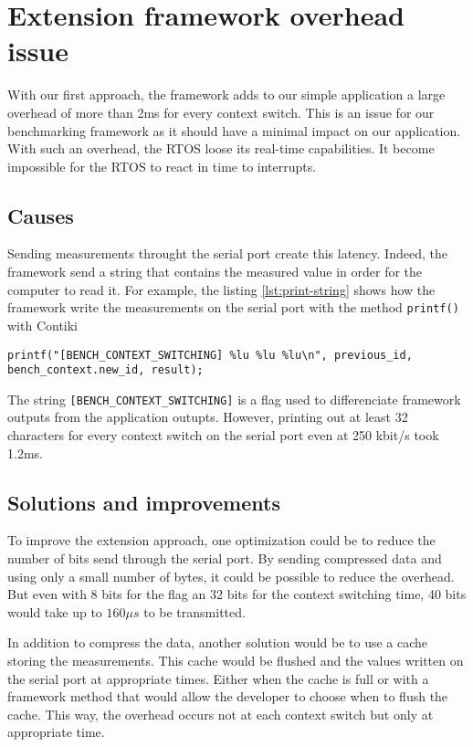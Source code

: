 \section{Extension framework overhead issue\label{sec:overhead}}

With our first approach, the framework adds to our simple application a large overhead of more than 2ms for every context switch.
This is an issue for our benchmarking framework as it should have a minimal impact on our application.
With such an overhead, the RTOS loose its real-time capabilities.
It become impossible for the RTOS to react in time to interrupts.

\subsection{Causes}

Sending measurements throught the serial port create this latency.
Indeed, the framework send a string that contains the measured value in order for the computer to read it.
For example, the listing \ref{lst:print-string} shows how the framework write the measurements on the serial port with the method \texttt{printf()} with Contiki

\begin{lstlisting}[style=CStyle, float, label={lst:print-string}, caption={writting the measurements to the serial port with Contiki}]
  printf("[BENCH_CONTEXT_SWITCHING] %lu %lu %lu\n", previous_id, bench_context.new_id, result);
\end{lstlisting}

The string \texttt{[BENCH\_CONTEXT\_SWITCHING]} is a flag used to differenciate framework outputs from the application outupts.
However, printing out at least 32 characters for every context switch on the serial port even at 250 kbit/s took 1.2ms.

\subsection{Solutions and improvements}

To improve the extension approach, one optimization could be to reduce the number of bits send through the serial port.
By sending compressed data and using only a small number of bytes, it could be possible to reduce the overhead.
But even with 8 bits for the flag an 32 bits for the context switching time, 40 bits would take up to $160\mu s$ to be transmitted.

In addition to compress the data, another solution would be to use a cache storing the measurements.
This cache would be flushed and the values written on the serial port at appropriate times.
Either when the cache is full or with a framework method that would allow the developer to choose when to flush the cache.
This way, the overhead occurs not at each context switch but only at appropriate time.

